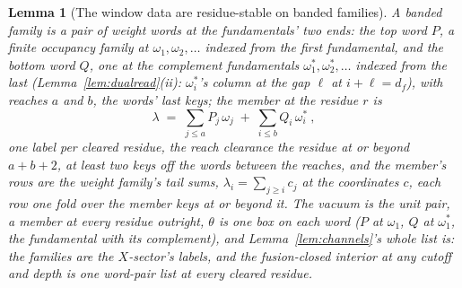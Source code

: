 \documentclass[11pt]{article}
\newtheorem{lemma}{Lemma}
\theoremstyle{definition}
\begin{document}
\begin{lemma}[The window data are residue-stable on banded families]
\label{lem:rankstable}
A \emph{banded family} is a pair of weight words at the
fundamentals' two ends: the \emph{top word} $P$, a finite occupancy
family at $\omega_1,\omega_2,\dots$ indexed from the first
fundamental, and the \emph{bottom word} $Q$, one at the complement
fundamentals $\omega_1^*,\omega_2^*,\dots$ indexed from the last
(Lemma~\ref{lem:dualread}(ii): $\omega_i^*$'s column at the gap
$\ell$ at $i+\ell=d_f$), with
\emph{reaches} $a$ and $b$, the words' last keys; the member at the
residue $r$ is
\[
\lambda\;=\;\sum_{j\le a}P_j\,\omega_j\;+\;\sum_{i\le b}Q_i\,\omega_i^*\ ,
\]
one label per cleared residue, the \emph{reach clearance} the
residue at or beyond $a+b+2$, at least two keys off the words
between the reaches, and the member's rows are the weight family's tail sums,
$\lambda_i=\sum_{j\ge i}c_j$ at the coordinates $c$, each row one
fold over the member keys at or beyond it.
The vacuum is the unit pair, a member at every residue outright,
$\theta$ is one box on each word
($P$ at $\omega_1$, $Q$ at $\omega_1^*$, the fundamental with its
complement), and
Lemma~\ref{lem:channels}'s whole list is:
the families are the $X$-sector's labels, and the fusion-closed
interior at any cutoff and depth is one word-pair list at every
cleared residue.


\end{lemma}
\end{document}
